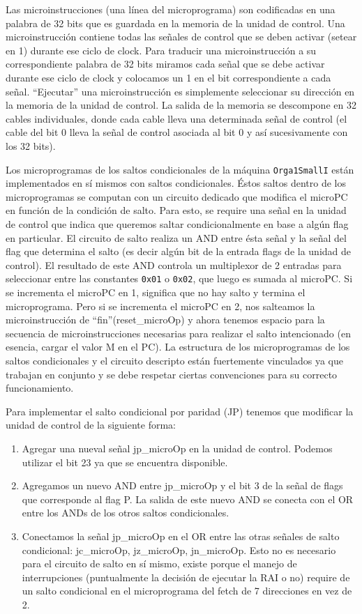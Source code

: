 Las microinstrucciones (una línea del microprograma) son codificadas en una palabra de 32 bits que es guardada en la memoria de la unidad de control.
Una microinstrucción contiene todas las señales de control que se deben activar (setear en 1) durante ese ciclo de clock.
Para traducir una microinstrucción a su correspondiente palabra de 32 bits miramos cada señal que se debe activar durante ese ciclo de clock y colocamos un 1 en el bit correspondiente a cada señal.
``Ejecutar'' una microinstrucción es simplemente seleccionar su dirección en la memoria de la unidad de control. La salida de la memoria se descompone en 32 cables individuales, donde cada cable lleva una determinada señal de control (el cable del bit 0 lleva la señal de control asociada al bit 0 y así sucesivamente con los 32 bits).

Los microprogramas de los saltos condicionales de la máquina \lstinline{Orga1SmallI} están implementados en sí mismos con saltos condicionales. Éstos saltos dentro de los microprogramas se computan con un circuito dedicado que modifica el microPC en función de la condición de salto. Para esto, se require una señal en la unidad de control que indica que queremos saltar condicionalmente en base a algún flag en particular. El circuito de salto realiza un AND entre ésta señal y la señal del flag que determina el salto (es decir algún bit de la entrada flags de la unidad de control). El resultado de este AND controla un multiplexor de 2 entradas para seleccionar entre las constantes \lstinline{0x01} o \lstinline{0x02}, que luego es sumada al microPC. Si se incrementa el microPC en 1, significa que no hay salto y termina el microprograma. Pero si se incrementa el microPC en 2, nos salteamos la microinstrucción de ``fin''(reset\_microOp) y ahora tenemos espacio para la secuencia de microinstrucciones necesarias para realizar el salto intencionado (en esencia, cargar el valor M en el PC). La estructura de los microprogramas de los saltos condicionales y el circuito descripto están fuertemente vinculados ya que trabajan en conjunto y se debe respetar ciertas convenciones para su correcto funcionamiento.

Para implementar el salto condicional por paridad (JP) tenemos que modificar la unidad de control de la siguiente forma:

\begin{enumerate}
    \item Agregar una nueval señal jp\_microOp en la unidad de control. Podemos utilizar el bit 23 ya que se encuentra disponible.
    \item Agregamos un nuevo AND entre jp\_microOp y el bit 3 de la señal de flags que corresponde al flag P. La salida de este nuevo AND se conecta con el OR entre los ANDs de los otros saltos condicionales.
    \item Conectamos la señal jp\_microOp en el OR entre las otras señales de salto condicional: jc\_microOp, jz\_microOp, jn\_microOp. Esto no es necesario para el circuito de salto en sí mismo, existe porque el manejo de interrupciones (puntualmente la decisión de ejecutar la RAI o no) require de un salto condicional en el microprograma del fetch de 7 direcciones en vez de 2.
\end{enumerate}

